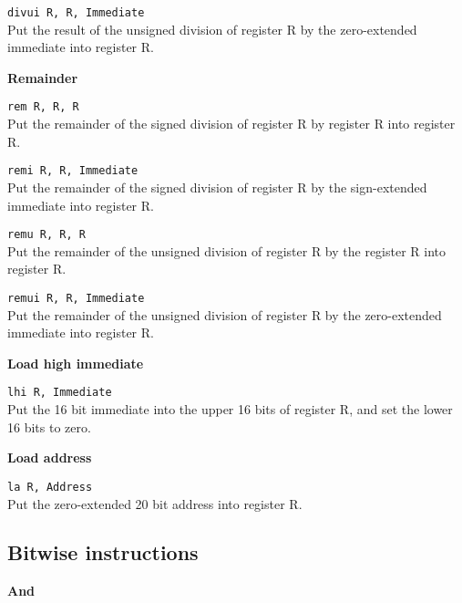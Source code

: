 \documentclass[12pt]{report}
\newcommand\subscr[1]{\raisebox{-0.5ex}{\small #1}}
\newcommand\regs{R\subscr{s}}
\newcommand\regd{R\subscr{d}}
\newcommand\regt{R\subscr{t}}
\begin{document}
\texttt{divui \regd, \regs, Immediate}\\
Put the result of the unsigned division of register \regs{} by the zero-extended immediate
into register \regd{}.
\vspace{1ex}

\noindent
{\bf Remainder}

\texttt{rem \regd, \regs, \regt}\\
Put the remainder of the signed division of register \regs{} by register \regt{}
into register \regd{}.
\vspace{1ex}

\texttt{remi \regd, \regs, Immediate}\\
Put the remainder of the signed division of register \regs{} by the sign-extended immediate
into register \regd{}.
\vspace{1ex}

\texttt{remu \regd, \regs, \regt}\\
Put the remainder of the unsigned division of register \regs{} by the register \regt{}
into register \regd{}.
\vspace{1ex}

\texttt{remui \regd, \regs, Immediate}\\
Put the remainder of the unsigned division of register \regs{} by the zero-extended immediate
into register \regd{}.
\vspace{1ex}

\noindent
{\bf Load high immediate}

\texttt{lhi \regd, Immediate}\\
Put the 16 bit immediate into the upper 16 bits of register \regd{},
and set the lower 16 bits to zero.
\vspace{1ex}

\noindent
{\bf Load address}

\texttt{la \regd, Address}\\
Put the zero-extended 20 bit address into register \regd{}.
\vspace{1ex}

\subsection{Bitwise instructions}

\noindent
{\bf And}
\end{document}
